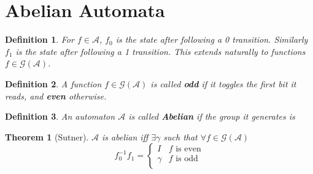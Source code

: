 \documentclass{beamer}
\newtheorem{thm}{Theorem}
\newtheorem{defn}{Definition}
\newcommand{\2}{\textbf{2}}
\newcommand{\A}{\mathcal{A}}
\newcommand{\G}{\mathcal{G}}
\begin{document}
\section{Abelian Automata}
\begin{frame}
  \begin{defn}
    For $f \in \A$, $f_0$ is the state after following a 0 transition.
    Similarly $f_1$ is the state after following a 1 transition.
    This extends naturally to functions $f \in \G(\A)$.
  \end{defn}

  \begin{defn}
    A function $f \in \G(\A)$ is called \textbf{odd} if it toggles
    the first bit it reads, and \textbf{even} otherwise.
  \end{defn}

  \begin{defn}
    An automaton $\A$ is called \textbf{Abelian} if the group it generates is
  \end{defn}

  \begin{thm}[Sutner]
    $\A$ is abelian iff $\exists \gamma$ such that 
    $\forall f \in \G(\A)$ 
    \[
      f_0^{-1}f_1 = 
      \begin{cases}
        I      & f \text{ is even}\\
        \gamma & f \text{ is odd}\\
      \end{cases}
    \]
  \end{thm}
\end{frame}
\end{document}
